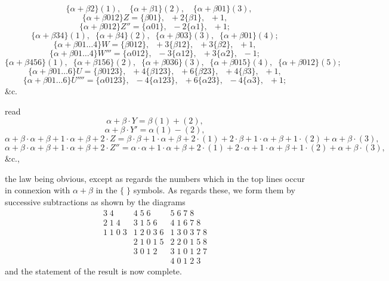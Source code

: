 \documentclass[11pt,a4paper]{article}
\begin{document}
\[
\quad \{\alpha + \beta 2\}(1),\quad \{\alpha + \beta 1\}(2),\quad \{\alpha + \beta 01\}(3),
\]
\[
\{\alpha + \beta 012\}Z = \{\beta 01\},\;\; +2\{\beta 1\},\;\; +1,
\]
\[
\{\alpha + \beta 012\}Z'' = \{\alpha 01\},\;\; -2\{\alpha 1\},\;\; +1;
\]
\[
\{\alpha + \beta 34\}(1),\;\; \{\alpha + \beta 4\}(2),\;\; \{\alpha + \beta 03\}(3),\;\; \{\alpha + \beta 01\}(4);
\]
\[
\{\alpha + \beta 01\ldots 4\}W = \{\beta 012\},\;\; +3\{\beta 12\},\;\; +3\{\beta 2\},\;\; +1,
\]
\[
\{\alpha + \beta 01\ldots 4\}W''' = \{\alpha 012\},\;\; -3\{\alpha 12\},\;\; +3\{\alpha 2\},\;\; -1;
\]
\[
\{\alpha + \beta 456\}(1),\;\; \{\alpha + \beta 156\}(2),\;\; \{\alpha + \beta 036\}(3),\;\; \{\alpha + \beta 015\}(4),\;\; \{\alpha + \beta 012\}(5);
\]
\[
\{\alpha + \beta 01\ldots 6\}U = \{\beta 0123\},\;\; + 4\{\beta 123\},\;\; +6\{\beta 23\},\;\; +4\{\beta 3\},\;\; +1,
\]
\[
\{\alpha + \beta 01\ldots 6\}U'''' = \{\alpha 0123\},\;\; -4\{\alpha 123\},\;\; +6\{\alpha 23\},\;\; -4\{\alpha 3\},\;\; +1;
\]
\&c.

\medskip

\noindent read
\[
\alpha + \beta\cdot Y = \beta(1) + (2),
\]
\[
\alpha + \beta\cdot Y' = \alpha(1) - (2),
\]
\[
\alpha + \beta\cdot \alpha + \beta + 1\cdot \alpha + \beta + 2\cdot Z = \beta\cdot \beta + 1\cdot \alpha + \beta + 2\cdot (1) + 2\cdot \beta + 1\cdot \alpha + \beta + 1\cdot (2) + \alpha + \beta\cdot (3),
\]
\[
\alpha + \beta\cdot \alpha + \beta + 1\cdot \alpha + \beta + 2\cdot Z'' = \alpha\cdot \alpha + 1\cdot \alpha + \beta + 2\cdot (1) + 2\cdot \alpha + 1\cdot \alpha + \beta + 1\cdot (2) + \alpha + \beta\cdot (3),
\]
\&c.,

\medskip

\noindent the law being obvious, except as regards the numbers which in the top lines occur in connexion with $\alpha + \beta$ in the $\{\;\}$ symbols. As regards these, we form them by successive subtractions as shown by the diagrams
\[
\begin{array}{c|c|c}
3\;4 & 4\;5\;6 & 5\;6\;7\;8\\
2\;1\;4 & 3\;1\;5\;6 & 4\;1\;6\;7\;8\\
1\;1\;0\;3 & 1\;2\;0\;3\;6 & 1\;3\;0\;3\;7\;8\\
& 2\;1\;0\;1\;5 & 2\;2\;0\;1\;5\;8\\
& 3\;0\;1\;2 & 3\;1\;0\;1\;2\;7\\
& & 4\;0\;1\;2\;3
\end{array}
\]
and the statement of the result is now complete.

\medskip
\end{document}
